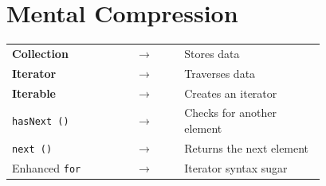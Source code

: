 \documentclass[11pt,a4paper]{book}
\begin{document}




















\section{Mental Compression}

\begin{center}

\renewcommand{\arraystretch}{1.7}

\begin{tabular}{p{0.33\linewidth}c p{0.45\linewidth}}

\textbf{Collection}
&
$\rightarrow$
&
Stores data

\\

\textbf{Iterator}
&
$\rightarrow$
&
Traverses data

\\

\textbf{Iterable}
&
$\rightarrow$
&
Creates an iterator

\\

\texttt{hasNext ()}
&
$\rightarrow$
&
Checks for another element

\\

\texttt{next ()}
&
$\rightarrow$
&
Returns the next element

\\

Enhanced \texttt{for}
&
$\rightarrow$
&
Iterator syntax sugar

\end{tabular}

\end{center}
\end{document}
